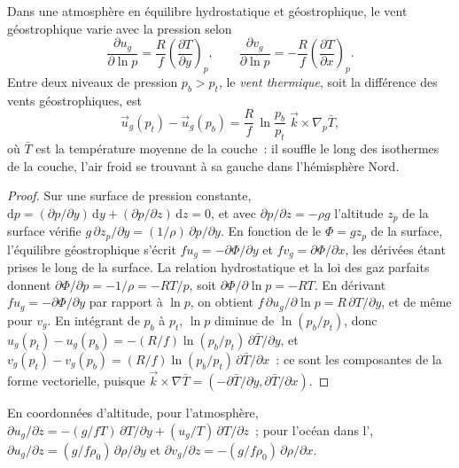 \begin{theorem}\label{thm:b3:gfd-foundations:thermal-wind}
Dans une atmosphère en équilibre hydrostatique et géostrophique, le vent géostrophique
varie avec la pression selon
\[
\frac{\partial u_g}{\partial\ln p} = \frac{R}{f}\left(\frac{\partial T}{\partial y}\right)_p ,
\qquad
\frac{\partial v_g}{\partial\ln p} = -\frac{R}{f}\left(\frac{\partial T}{\partial x}\right)_p .
\]
Entre deux niveaux de pression $p_b > p_t$, le \emph{vent
thermique}, soit la différence des vents géostrophiques, est
\[
\vec u_g(p_t) - \vec u_g(p_b) = \frac{R}{f}\,\ln\frac{p_b}{p_t}\;\vec k\times\nabla_p\bar T ,
\]
où $\bar T$ est la température moyenne de la couche~: il souffle le long des
isothermes de la couche, l'air froid se trouvant à sa gauche dans l'hémisphère
Nord.
\end{theorem}

\begin{proof}
Sur une surface de pression constante, $\mathrm dp = (\partial p/\partial y)
\,\mathrm dy + (\partial p/\partial z)\,\mathrm dz = 0$, et avec
$\partial p/\partial z = -\rho g$ l'altitude $z_p$ de la surface vérifie
$g\,\partial z_p/\partial y = (1/\rho)\,\partial p/\partial y$. En fonction de
le  $\Phi = gz_p$ de la surface, l'équilibre géostrophique s'écrit
$fu_g = -\partial\Phi/\partial y$ et $fv_g = \partial\Phi/\partial x$, les dérivées
étant prises le long de la surface. La relation hydrostatique et la loi des gaz
parfaits donnent $\partial\Phi/\partial p = -1/\rho = -RT/p$, soit
$\partial\Phi/\partial\ln p = -RT$. En dérivant $fu_g =
-\partial\Phi/\partial y$ par rapport à $\ln p$, on obtient $f\,\partial
u_g/\partial\ln p = R\,\partial T/\partial y$, et de même pour $v_g$.
En intégrant de $p_b$ à $p_t$, $\ln p$ diminue de $\ln(p_b/p_t)$, donc
$u_g(p_t) - u_g(p_b) = -(R/f)\ln(p_b/p_t)\,\partial\bar T/\partial y$, et
$v_g(p_t) - v_g(p_b) = (R/f)\ln(p_b/p_t)\,\partial\bar T/\partial x$~: ce sont
les composantes de la forme vectorielle, puisque $\vec k\times\nabla\bar T =
(-\partial\bar T/\partial y, \partial\bar T/\partial x)$.
\end{proof}

\begin{corollary}\label{cor:b3:gfd-foundations:thermal-wind-z}
En coordonnées d'altitude, pour l'atmosphère, $\partial u_g/\partial z =
-(g/fT)\,\partial T/\partial y + (u_g/T)\,\partial T/\partial z$~; pour
l'océan dans l', $\partial u_g/\partial z =
(g/f\rho_0)\,\partial\rho/\partial y$ et $\partial v_g/\partial z =
-(g/f\rho_0)\,\partial\rho/\partial x$.
\end{corollary}


